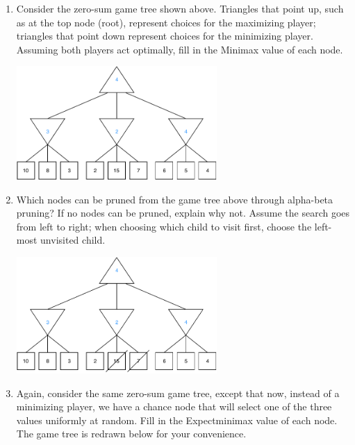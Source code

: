 \documentclass[11pt, a4paper]{article}
\begin{document}
\begin{enumerate}
    \item Consider the zero-sum game tree shown above. Triangles that point up, such as at the top node (root), represent choices for the maximizing player; triangles that point down represent choices for the minimizing player. Assuming both players act optimally, fill in the Minimax value of each node.
    
    \begin{solution}
        \begin{center}
            \includegraphics[width=0.6\textwidth]{figures/e2_minimax_1.pdf}
        \end{center}
    \end{solution}
    
    \item Which nodes can be pruned from the game tree above through alpha-beta pruning? If no nodes can be pruned, explain why not. Assume the search goes from left to right; when choosing which child to visit first, choose the left-most unvisited child.
    
    \begin{solution}
        \begin{center}
            \includegraphics[width=0.6\textwidth]{figures/e2_minimax_2.pdf}
        \end{center}
    \end{solution}

    \item  Again, consider the same zero-sum game tree, except that now, instead of a minimizing player, we have a chance node that will select one of the three values uniformly at random. Fill in the Expectminimax value of each node. The game tree is redrawn below for your convenience.
    

\end{enumerate}
\end{document}
